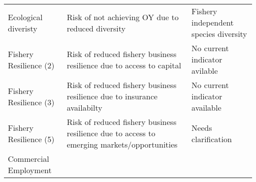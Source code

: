 \documentclass[11pt,]{article}
\begin{document}
\begin{longtable}[]{@{}lll@{}}
\begin{minipage}[t]{0.25\columnwidth}
Ecological diveristy\strut
\end{minipage} & \begin{minipage}[t]{0.33\columnwidth}\raggedright\strut
Risk of not achieving OY due to reduced diversity\strut
\end{minipage} & \begin{minipage}[t]{0.33\columnwidth}\raggedright\strut
Fishery independent species diversity\strut
\end{minipage}\tabularnewline
\begin{minipage}[t]{0.25\columnwidth}\raggedright\strut
Fishery Resilience (2)\strut
\end{minipage} & \begin{minipage}[t]{0.33\columnwidth}\raggedright\strut
Risk of reduced fishery business resilience due to access to
capital\strut
\end{minipage} & \begin{minipage}[t]{0.33\columnwidth}\raggedright\strut
No current indicator avilable\strut
\end{minipage}\tabularnewline
\begin{minipage}[t]{0.25\columnwidth}\raggedright\strut
Fishery Resilience (3)\strut
\end{minipage} & \begin{minipage}[t]{0.33\columnwidth}\raggedright\strut
Risk of reduced fishery business resilience due to insurance
availabilty\strut
\end{minipage} & \begin{minipage}[t]{0.33\columnwidth}\raggedright\strut
No current indicator available\strut
\end{minipage}\tabularnewline
\begin{minipage}[t]{0.25\columnwidth}\raggedright\strut
Fishery Resilience (5)\strut
\end{minipage} & \begin{minipage}[t]{0.33\columnwidth}\raggedright\strut
Risk of reduced fishery business resilience due to access to emerging
markets/opportunities\strut
\end{minipage} & \begin{minipage}[t]{0.33\columnwidth}\raggedright\strut
Needs clarification\strut
\end{minipage}\tabularnewline
\begin{minipage}[t]{0.25\columnwidth}\raggedright\strut
Commercial Employment\strut
\end{minipage} & \begin{minipage}[t]{0.33\columnwidth}\raggedright\strut

\end{minipage}
\end{longtable}
\end{document}
